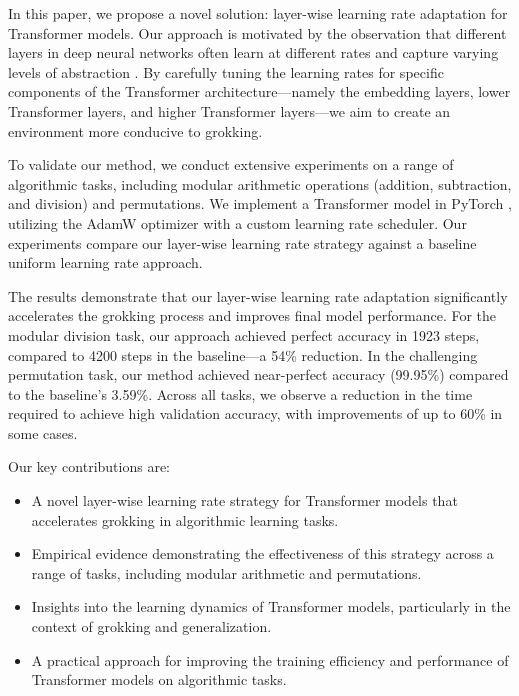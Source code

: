 \documentclass{article} %
\begin{document}
In this paper, we propose a novel solution: layer-wise learning rate adaptation for Transformer models. Our approach is motivated by the observation that different layers in deep neural networks often learn at different rates and capture varying levels of abstraction \cite{goodfellow2016deep}. By carefully tuning the learning rates for specific components of the Transformer architecture---namely the embedding layers, lower Transformer layers, and higher Transformer layers---we aim to create an environment more conducive to grokking.

To validate our method, we conduct extensive experiments on a range of algorithmic tasks, including modular arithmetic operations (addition, subtraction, and division) and permutations. We implement a Transformer model in PyTorch \cite{paszke2019pytorch}, utilizing the AdamW optimizer \cite{loshchilov2017adamw} with a custom learning rate scheduler. Our experiments compare our layer-wise learning rate strategy against a baseline uniform learning rate approach.

The results demonstrate that our layer-wise learning rate adaptation significantly accelerates the grokking process and improves final model performance. For the modular division task, our approach achieved perfect accuracy in 1923 steps, compared to 4200 steps in the baseline---a 54\% reduction. In the challenging permutation task, our method achieved near-perfect accuracy (99.95\%) compared to the baseline's 3.59\%. Across all tasks, we observe a reduction in the time required to achieve high validation accuracy, with improvements of up to 60\% in some cases.

Our key contributions are:

\begin{itemize}
    \item A novel layer-wise learning rate strategy for Transformer models that accelerates grokking in algorithmic learning tasks.
    \item Empirical evidence demonstrating the effectiveness of this strategy across a range of tasks, including modular arithmetic and permutations.
    \item Insights into the learning dynamics of Transformer models, particularly in the context of grokking and generalization.
    \item A practical approach for improving the training efficiency and performance of Transformer models on algorithmic tasks.
\end{itemize}
\end{document}
